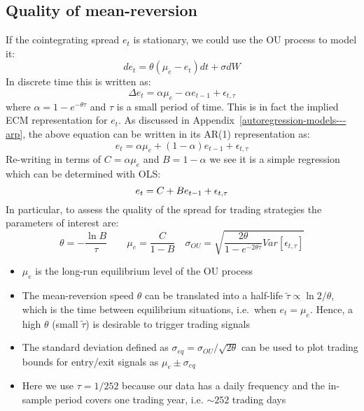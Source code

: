 \documentclass[11pt]{article}
\begin{document}
    \subsection{Quality of mean-reversion}\label{quality-of-mean-reversion}
    
    
If the cointegrating spread \(e_t\) is stationary, we could use the OU
process to model it:
\begin{equation}
d e_t = \theta (\mu_e - e_t) dt + \sigma dW
\end{equation}
In discrete time this is written as:
\begin{equation} 
\Delta e_t = \alpha \mu_e - \alpha e_{t-1} + \epsilon_{t, \tau}
\end{equation}
where \(\alpha= 1 - e^{-\theta \tau}\) and \(\tau\) is a small period of
time. This is in fact the implied ECM representation for \(e_t\). As
discussed in Appendix~\ref{autoregression-models---arp}, the above equation can be written in its
AR(1) representation as:
\begin{equation}
e_t = \alpha \mu_e + (1-\alpha)e_{t-1} + \epsilon_{t, \tau}
\end{equation}
Re-writing in terms of \(C = \alpha \mu_e\) and \(B=1-\alpha\) we see it
is a simple regression which can be determined with OLS:
\begin{equation} 
e_t = C + B e_{t-1} + \epsilon_{t, \tau} \\
\end{equation}
In particular, to assess the quality of the spread for trading
strategies the parameters of interest are:
\begin{equation}
\theta = -\frac{\ln B}{\tau} \qquad \mu_e = \frac{C}{1-B} 
\quad \sigma_{OU} = \sqrt{\frac{2 \theta}{1-e^{-2\theta \tau}} Var[\epsilon_{t, \tau}]}
\end{equation}
\begin{itemize}
\item
  \(\mu_e\) is the long-run equilibrium level of the OU process
\item
  The mean-reversion speed \(\theta\) can be translated into a half-life
  $\tilde{\tau} \propto \ln 2 / \theta $, which is the time between
  equilibrium situations, i.e.~when \(e_t = \mu_e\). Hence, a high
  \(\theta\) (small \(\tilde{\tau}\)) is desirable to trigger trading
  signals
\item
  The standard deviation defined as
  \(\sigma_{eq} = \sigma_{OU} / \sqrt{2 \theta}\) can be used to plot
  trading bounds for entry/exit signals as \(\mu_e \pm \sigma_{eq}\)
\item
  Here we use \(\tau = 1/252\) because our data has a daily frequency and
  the in-sample period covers one trading year, i.e. \(\sim 252\) trading
  days
\end{itemize}
\end{document}
